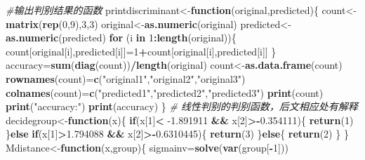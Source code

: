 \documentclass[]{article}
\newenvironment{Shaded}{\begin{snugshade}}{\end{snugshade}}
\newcommand{\CommentTok}[1]{\textcolor[rgb]{0.56,0.35,0.01}{\textit{#1}}}
\newcommand{\ControlFlowTok}[1]{\textcolor[rgb]{0.13,0.29,0.53}{\textbf{#1}}}
\newcommand{\DecValTok}[1]{\textcolor[rgb]{0.00,0.00,0.81}{#1}}
\newcommand{\FloatTok}[1]{\textcolor[rgb]{0.00,0.00,0.81}{#1}}
\newcommand{\KeywordTok}[1]{\textcolor[rgb]{0.13,0.29,0.53}{\textbf{#1}}}
\newcommand{\NormalTok}[1]{#1}
\newcommand{\OperatorTok}[1]{\textcolor[rgb]{0.81,0.36,0.00}{\textbf{#1}}}
\newcommand{\StringTok}[1]{\textcolor[rgb]{0.31,0.60,0.02}{#1}}
\begin{document}
\begin{Shaded}
\begin{Highlighting}[]
\CommentTok{#输出判别结果的函数}
\NormalTok{printdiscriminant<-}\ControlFlowTok{function}\NormalTok{(original,predicted)\{}
\NormalTok{  count<-}\KeywordTok{matrix}\NormalTok{(}\KeywordTok{rep}\NormalTok{(}\DecValTok{0}\NormalTok{,}\DecValTok{9}\NormalTok{),}\DecValTok{3}\NormalTok{,}\DecValTok{3}\NormalTok{)}
\NormalTok{  original<-}\KeywordTok{as.numeric}\NormalTok{(original)}
\NormalTok{  predicted<-}\KeywordTok{as.numeric}\NormalTok{(predicted)}
  \ControlFlowTok{for}\NormalTok{ (i }\ControlFlowTok{in} \DecValTok{1}\OperatorTok{:}\KeywordTok{length}\NormalTok{(original))\{}
\NormalTok{    count[original[i],predicted[i]]=}\DecValTok{1}\OperatorTok{+}\NormalTok{count[original[i],predicted[i]]}
\NormalTok{  \}}
\NormalTok{  accuracy=}\KeywordTok{sum}\NormalTok{(}\KeywordTok{diag}\NormalTok{(count))}\OperatorTok{/}\KeywordTok{length}\NormalTok{(original)}
\NormalTok{  count<-}\KeywordTok{as.data.frame}\NormalTok{(count)}
  \KeywordTok{rownames}\NormalTok{(count)=}\KeywordTok{c}\NormalTok{(}\StringTok{"original1"}\NormalTok{,}\StringTok{"original2"}\NormalTok{,}\StringTok{"original3"}\NormalTok{)}
  \KeywordTok{colnames}\NormalTok{(count)=}\KeywordTok{c}\NormalTok{(}\StringTok{"predicted1"}\NormalTok{,}\StringTok{"predicted2"}\NormalTok{,}\StringTok{"predicted3"}\NormalTok{)}
  \KeywordTok{print}\NormalTok{(count)}
  \KeywordTok{print}\NormalTok{(}\StringTok{"accuracy:"}\NormalTok{)}
  \KeywordTok{print}\NormalTok{(accuracy)}
\NormalTok{\}}
\CommentTok{# 线性判别的判别函数，后文相应处有解释}
\NormalTok{decidegroup<-}\ControlFlowTok{function}\NormalTok{(x)\{}
  \ControlFlowTok{if}\NormalTok{(x[}\DecValTok{1}\NormalTok{]}\OperatorTok{<}\StringTok{ }\FloatTok{-1.891911} \OperatorTok{&&}\StringTok{ }\NormalTok{x[}\DecValTok{2}\NormalTok{]}\OperatorTok{>-}\FloatTok{0.354111}\NormalTok{)\{}
    \KeywordTok{return}\NormalTok{(}\DecValTok{1}\NormalTok{)}
\NormalTok{  \}}\ControlFlowTok{else} \ControlFlowTok{if}\NormalTok{(x[}\DecValTok{1}\NormalTok{]}\OperatorTok{>}\FloatTok{1.794088} \OperatorTok{&&}\StringTok{ }\NormalTok{x[}\DecValTok{2}\NormalTok{]}\OperatorTok{>-}\FloatTok{0.6310445}\NormalTok{)\{}
    \KeywordTok{return}\NormalTok{(}\DecValTok{3}\NormalTok{)}
\NormalTok{  \}}\ControlFlowTok{else}\NormalTok{\{}
    \KeywordTok{return}\NormalTok{(}\DecValTok{2}\NormalTok{)}
\NormalTok{  \}  }
\NormalTok{\}}
\NormalTok{Mdistance<-}\ControlFlowTok{function}\NormalTok{(x,group)\{}
\NormalTok{  sigmainv=}\KeywordTok{solve}\NormalTok{(}\KeywordTok{var}\NormalTok{(group[}\OperatorTok{-}\DecValTok{1}\NormalTok{]))}

\end{Highlighting}
\end{Shaded}
\end{document}
